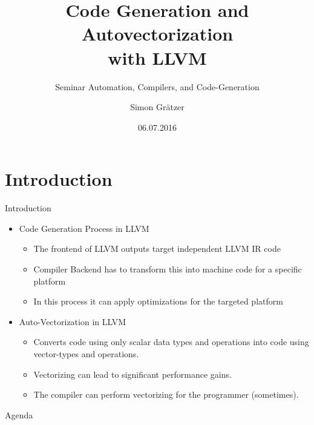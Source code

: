 \documentclass[]{beamer}
\title[LLVM: Code generation + autovec]{Code Generation and Autovectorization\\ with LLVM}
\subtitle{Seminar Automation, Compilers, and Code-Generation}
\author{Simon Grätzer}
\institute{High-Performance and Automatic Computing}
\date{06.07.2016}
\begin{document}

\section*{Introduction}
\begin{frame}{Introduction}
  \begin{itemize}
    \item Code Generation Process in LLVM
    \begin{itemize}
      \item The frontend of LLVM outputs target independent LLVM IR code
      \item Compiler Backend has to transform this into machine code for a specific platform
      \item In this process it can apply optimizations for the targeted platform
    \end{itemize}
    \item Auto-Vectorization in LLVM
    \begin{itemize}
      \item Converts code using only scalar data types and operations into code using vector-types and operations.
      \item Vectorizing can lead to significant performance gains.
      \item The compiler can perform vectorizing for the programmer (sometimes).
    \end{itemize}
  \end{itemize}
\end{frame}

\begin{frame}{Agenda}
  \tableofcontents
\end{frame}
\end{document}
